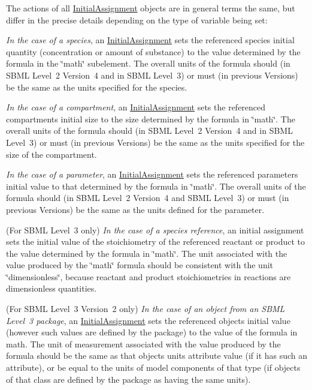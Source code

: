 The actions of all \hyperlink{class_initial_assignment}{Initial\+Assignment} objects are in general terms the same, but differ in the precise details depending on the type of variable being set\+: 
\begin{DoxyItemize}
\item {\itshape In the case of a species}, an \hyperlink{class_initial_assignment}{Initial\+Assignment} sets the referenced species\textquotesingle{} initial quantity (concentration or amount of substance) to the value determined by the formula in the \char`\"{}math\char`\"{} subelement. The overall units of the formula should (in S\+B\+ML Level~2 Version~4 and in S\+B\+ML Level~3) or must (in previous Versions) be the same as the units specified for the species.


\item {\itshape In the case of a compartment}, an \hyperlink{class_initial_assignment}{Initial\+Assignment} sets the referenced compartment\textquotesingle{}s initial size to the size determined by the formula in \char`\"{}math\char`\"{}. The overall units of the formula should (in S\+B\+ML Level~2 Version~4 and in S\+B\+ML Level~3) or must (in previous Versions) be the same as the units specified for the size of the compartment.


\item {\itshape In the case of a parameter}, an \hyperlink{class_initial_assignment}{Initial\+Assignment} sets the referenced parameter\textquotesingle{}s initial value to that determined by the formula in \char`\"{}math\char`\"{}. The overall units of the formula should (in S\+B\+ML Level~2 Version~4 and S\+B\+ML Level~3) or must (in previous Versions) be the same as the units defined for the parameter.


\item (For S\+B\+ML Level~3 only) {\itshape In the case of a species reference}, an initial assignment sets the initial value of the stoichiometry of the referenced reactant or product to the value determined by the formula in \char`\"{}math\char`\"{}. The unit associated with the value produced by the \char`\"{}math\char`\"{} formula should be consistent with the unit \char`\"{}dimensionless\char`\"{}, because reactant and product stoichiometries in reactions are dimensionless quantities.


\item (For S\+B\+ML Level~3 Version~2 only) {\itshape In the case of an object from an S\+B\+ML Level~3 package}, an \hyperlink{class_initial_assignment}{Initial\+Assignment} sets the referenced object\textquotesingle{}s initial value (however such values are defined by the package) to the value of the formula in math. The unit of measurement associated with the value produced by the formula should be the same as that object\textquotesingle{}s units attribute value (if it has such an attribute), or be equal to the units of model components of that type (if objects of that class are defined by the package as having the same units).


\end{DoxyItemize}


